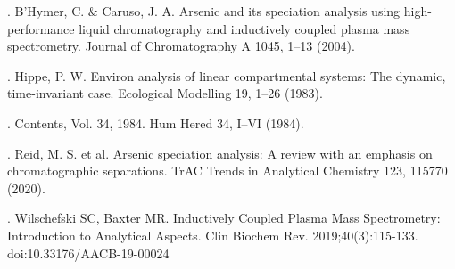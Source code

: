 \documentclass[12pt]{article}
\begin{document}
. B’Hymer, C. \& Caruso, J. A. Arsenic and its speciation analysis using high-performance liquid chromatography and inductively coupled plasma mass spectrometry. Journal of Chromatography A 1045, 1–13 (2004).

. Hippe, P. W. Environ analysis of linear compartmental systems: The dynamic, time-invariant case. Ecological Modelling 19, 1–26 (1983).

. Contents, Vol. 34, 1984. Hum Hered 34, I–VI (1984).

. Reid, M. S. et al. Arsenic speciation analysis: A review with an emphasis on chromatographic separations. TrAC Trends in Analytical Chemistry 123, 115770 (2020).

. Wilschefski SC, Baxter MR. Inductively Coupled Plasma Mass Spectrometry: Introduction to Analytical Aspects. Clin Biochem Rev. 2019;40(3):115-133. doi:10.33176/AACB-19-00024
\end{document}
